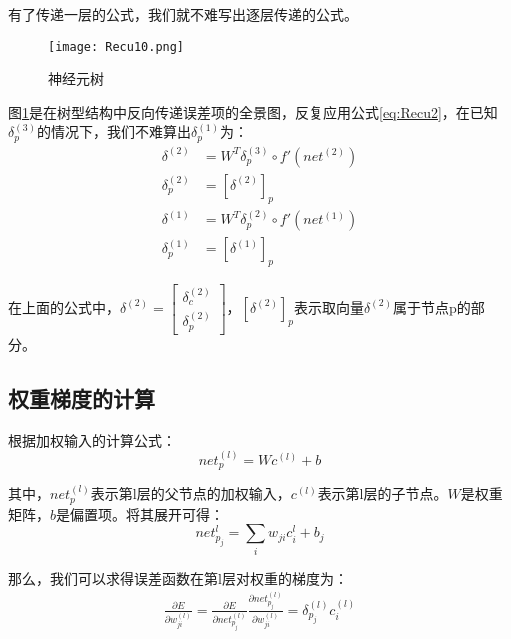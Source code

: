 有了传递一层的公式，我们就不难写出逐层传递的公式。

\begin{figure}[!h]
	\centering
	\texttt{[image: Recu10.png]}
	\caption{神经元树}
	\label{fig:Recu10}
\end{figure}

图\ref{fig:Recu10}是在树型结构中反向传递误差项的全景图，反复应用公式\ref{eq:Recu2}，在已知\(\delta_p^{(3)}\)的情况下，我们不难算出\(\delta_p^{(1)}\)为：
\begin{align*}
	\delta^{(2)}   & =W^T\delta_p^{(3)}\circ f'({net}^{(2)}) \\
	\delta_p^{(2)} & =[\delta^{(2)}]_p                       \\
	\delta^{(1)}   & =W^T\delta_p^{(2)}\circ f'({net}^{(1)}) \\
	\delta_p^{(1)} & =[\delta^{(1)}]_p
\end{align*}

在上面的公式中，\(\delta^{(2)}=\begin{bmatrix}\delta_c^{(2)}\\\delta_p^{(2)}\end{bmatrix}\)，\([\delta^{(2)}]_p\)表示取向量\(\delta^{(2)}\)属于节点p的部分。

\subsection{权重梯度的计算}\label{Recu:5}

根据加权输入的计算公式：
\[
	{net}_p^{(l)}=W{c}^{(l)}+{b}
\]

其中，\({net}_p^{(l)}\)表示第l层的父节点的加权输入，\({c}^{(l)}\)表示第l层的子节点。\(W\)是权重矩阵，\({b}\)是偏置项。将其展开可得：
\[
	{net}_{p_j}^l=\sum_i{w_{ji}c_i^l}+b_j
\]

那么，我们可以求得误差函数在第l层对权重的梯度为：
\begin{align*}
	\frac{\partial{E}}{\partial{w_{ji}^{(l)}}}=\frac{\partial{E}}{\partial{{net}_{p_j}^{(l)}}}\frac{\partial{{net}_{p_j}^{(l)}}}{\partial{w_{ji}^{(l)}}}=\delta_{p_j}^{(l)}c_i^{(l)}
\end{align*}


